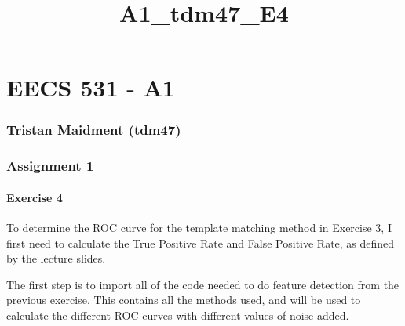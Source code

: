 \documentclass[11pt]{article}
\title{A1\_tdm47\_E4}
\begin{document}
    
    
    \maketitle
    
    

    
    \hypertarget{eecs-531---a1}{%
\section{EECS 531 - A1}\label{eecs-531---a1}}

\hypertarget{tristan-maidment-tdm47}{%
\subsubsection{Tristan Maidment (tdm47)}\label{tristan-maidment-tdm47}}

\hypertarget{assignment-1}{%
\subsubsection{Assignment 1}\label{assignment-1}}

\hypertarget{exercise-4}{%
\paragraph{Exercise 4}\label{exercise-4}}

    To determine the ROC curve for the template matching method in Exercise
3, I first need to calculate the True Positive Rate and False Positive
Rate, as defined by the lecture slides.

The first step is to import all of the code needed to do feature
detection from the previous exercise. This contains all the methods
used, and will be used to calculate the different ROC curves with
different values of noise added.
\end{document}
